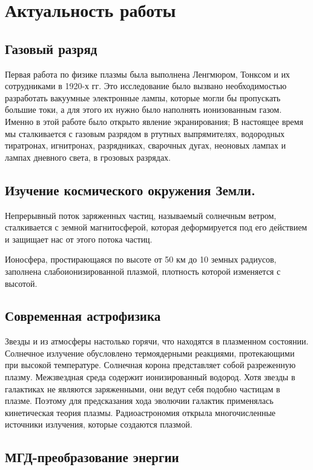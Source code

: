 



\section{Актуальность работы} %
\subsection{Газовый разряд}
Первая работа по физике плазмы была выполнена Ленгмюром, Тонксом и их сотрудниками в 1920-х гг. Это исследование было вызвано
необходимостью разработать вакуумные электронные лампы, 
которые могли бы пропускать большие токи, а для этого их нужно
было наполнять ионизованным газом. Именно в этой работе
было открыто явление экранирования; В настоящее время мы сталкивается с газовым разрядом
в ртутных выпрямителях, водородных тиратронах, игнитронах,
разрядниках, сварочных дугах, неоновых лампах и лампах 
дневного света, в грозовых разрядах.


\subsection{Изучение космического окружения Земли.}

Непрерывный поток заряженных частиц, называемый солнечным ветром,
сталкивается с земной магнитосферой, которая деформируется под его действием и защищает нас от этого потока частиц.

Ионосфера, простирающаяся по высоте от 50 км до 10 земных радиусов, заполнена слабоионизированной плазмой, плотность которой изменяется с высотой. 

\subsection{Современная астрофизика}

Звезды и из атмосферы настолько горячи, что находятся в плазменном состоянии. Солнечное излучение обусловлено термоядерными реакциями, протекающими при высокой температуре. Солнечная корона представляет собой разреженную плазму. Межзвездная среда содержит ионизированный водород. 
Хотя звезды в галактиках не являются заряженными, они ведут себя подобно частицам в плазме. Поэтому для предсказания хода эволючии галактик применялась кинетическая теория плазмы. Радиоастрономия открыла многочисленные источники излучения, которые создаются плазмой. 

\subsection{МГД-преобразование энергии}

